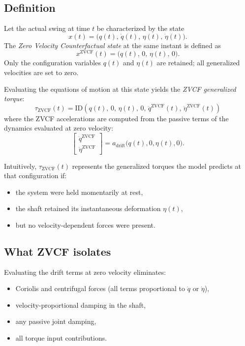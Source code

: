 \documentclass[12pt]{article}
\newcommand{\qd}{\dot{q}}
\newcommand{\qdd}{\ddot{q}}
\newcommand{\etad}{\dot{\eta}}
\newcommand{\etadd}{\ddot{\eta}}
\begin{document}
\subsection{Definition}

Let the actual swing at time \(t\) be characterized by the state
\[
x(t) = \big(q(t),\, \qd(t),\, \eta(t),\, \etad(t)\big).
\]
The \emph{Zero Velocity Counterfactual state} at the same instant is defined as
\begin{equation}
  x^{\mathrm{ZVCF}}(t)
  =
  \big(q(t),\, 0,\, \eta(t),\, 0\big).
  \label{eq:zvcf_state}
\end{equation}
Only the configuration variables \(q(t)\) and \(\eta(t)\) are retained; all generalized velocities are set to zero.

Evaluating the equations of motion at this state yields the \emph{ZVCF generalized torque}:
\begin{equation}
  \tau_{\mathrm{ZVCF}}(t)
  =
  \text{ID}\!\left(q(t),\, 0,\,
  \eta(t),\, 0,\,
  \qdd^{\mathrm{ZVCF}}(t),\, 
  \etadd^{\mathrm{ZVCF}}(t)\right)
  \label{eq:zvcf_id}
\end{equation}
where the ZVCF accelerations are computed from the passive terms of the dynamics evaluated at zero velocity:
\begin{equation}
  \begin{bmatrix}
    \qdd^{\mathrm{ZVCF}} \\[0.2em]
    \etadd^{\mathrm{ZVCF}}
  \end{bmatrix}
  =
  a_{\text{drift}}\big(q(t),0,\eta(t),0\big).
  \label{eq:zvcf_accel}
\end{equation}

Intuitively, \(\tau_{\mathrm{ZVCF}}(t)\) represents the generalized torques the model predicts at that configuration if:
\begin{itemize}
  \item the system were held momentarily at rest,
  \item the shaft retained its instantaneous deformation \(\eta(t)\),
  \item but no velocity-dependent forces were present.
\end{itemize}

\subsection{What ZVCF isolates}

Evaluating the drift terms at zero velocity eliminates:
\begin{itemize}
  \item Coriolis and centrifugal forces (all terms proportional to \(\qd\) or \(\etad\)),
  \item velocity-proportional damping in the shaft,
  \item any passive joint damping,
  \item all torque input contributions.
\end{itemize}
\end{document}
